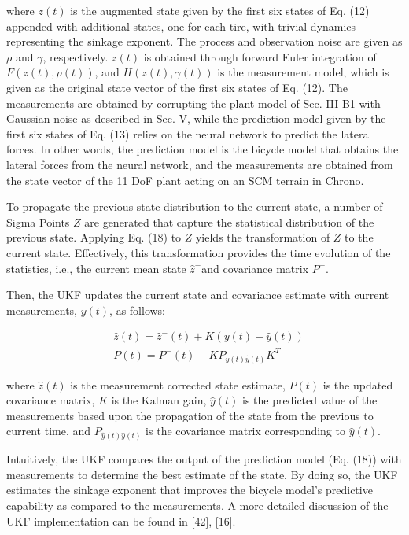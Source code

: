 \documentclass[10pt]{article}
\begin{document}
where $z(t)$ is the augmented state given by the first six states of Eq. (12) appended with additional states, one for each tire, with trivial dynamics representing the sinkage exponent. The process and observation noise are given as $\rho$ and $\gamma$, respectively. $z(t)$ is obtained through forward Euler integration of $F(z(t), \rho(t))$, and $H(z(t), \gamma(t))$ is the measurement model, which is given as the original state vector of the first six states of Eq. (12). The measurements are obtained by corrupting the plant model of Sec. III-B1 with Gaussian noise as described in Sec. V, while the prediction model given by the first six states of Eq. (13) relies on the neural network to predict the lateral forces. In other words, the prediction model is the bicycle model that obtains the lateral forces from the neural network, and the measurements are obtained from the state vector of the 11 DoF plant acting on an SCM terrain in Chrono.

To propagate the previous state distribution to the current state, a number of Sigma Points $Z$ are generated that capture the statistical distribution of the previous state. Applying Eq. (18) to $Z$ yields the transformation of $Z$ to the current state. Effectively, this transformation provides the time evolution of the statistics, i.e., the current mean state $\hat{z}^{-}$and covariance matrix $P^{-}$.

Then, the UKF updates the current state and covariance estimate with current measurements, $y(t)$, as follows:


\begin{align*}
& \hat{z}(t)=\hat{z}^{-}(t)+K(y(t)-\hat{y}(t))  \tag{20}\\
& P(t)=P^{-}(t)-K P_{\hat{y}(t) \hat{y}(t)} K^{T} \tag{21}
\end{align*}


where $\hat{z}(t)$ is the measurement corrected state estimate, $P(t)$ is the updated covariance matrix, $K$ is the Kalman gain, $\hat{y}(t)$ is the predicted value of the measurements based upon the propagation of the state from the previous to current time, and $P_{\hat{y}(t) \hat{y}(t)}$ is the covariance matrix corresponding to $\hat{y}(t)$.

Intuitively, the UKF compares the output of the prediction model (Eq. (18)) with measurements to determine the best estimate of the state. By doing so, the UKF estimates the sinkage exponent that improves the bicycle model's predictive capability as compared to the measurements. A more detailed discussion of the UKF implementation can be found in [42], [16].
\end{document}
